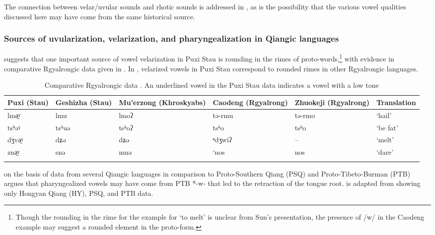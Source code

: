 \documentclass[output=paper]{langscibook}
\begin{document}
The connection between velar/uvular sounds and rhotic sounds is addressed in , as is the possibility that the various vowel qualities discussed here may have come from the same historical source.

\subsubsection{Sources of uvularization, velarization, and pharyngealization in Qiangic languages} \label{sec:guan:3.5.1}


\citet{Sun2000b} suggests that one important source of vowel velarization in Puxi Stau is rounding in the rimes of proto-words,\footnote{Though the rounding in the rime for the example for ‘to melt’ is unclear from Sun's presentation, the presence of /w/ in the Caodeng example may suggest a rounded element in the proto-form.} with evidence in comparative Rgyalrongic data given in . In , velarized vowels in Puxi Stau correspond to rounded rimes in other Rgyalrongic languages.

\begin{table}
\caption{Comparative Rgyalrongic data \citep[215]{Sun2000b}. An underlined vowel in the Puxi Stau data indicates a vowel with a low tone \citep[166]{Sun2000a}}
\label{tab:guan:14}
\begin{tabularx}{\textwidth}{p{0.9cm}Qp{2.1cm}p{2cm}p{2cm}l}
\lsptoprule
Puxi (Stau) & Geshizha (Stau) & Mu’erzong (Khroskyabs) & Caodeng (Rgyalrong) & Zhuokeji (Rgyalrong) & Translation\\
\midrule
{lmə̠ˠ} & {lmu} & {lmoʔ} & {tə-rmu} & {tə-rmo} & {`hail'}\\
{tsʰəˠ} & {tsʰuə} & {tsʰoʔ} & {tsʰo} & {tsʰo} & {`be fat'}\\
{dʒvə̠ˠ} & {dʑə} & {dʑə} & {ⁿdʒwiʔ} & {--} & {`melt'}\\
{znə̠ˠ} & {snə} & {mnə} & {‘nos} & {nos} & {`dare'}\\
\lspbottomrule
\end{tabularx}
\end{table}


\citet[114--118]{Evans2006a} on the basis of data from several Qiangic languages in comparison to Proto-Southern Qiang (PSQ) and Proto-Tibeto-Burman (PTB) argues that pharyngealized vowels may have come from PTB  *-w- that led to the retraction of the tongue root.  is adapted from \citet[114]{Evans2006a} showing only Hongyan Qiang (HY), PSQ, and PTB data.
\end{document}
